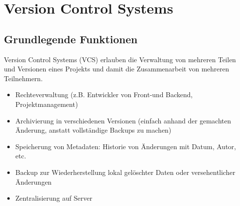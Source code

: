 \documentclass[12pt,a4]{article}
\begin{document}
	
	\section{Version Control Systems}

	\subsection{Grundlegende Funktionen}
		Version Control Systems (VCS) erlauben die Verwaltung von mehreren Teilen und Versionen eines Projekts und damit die Zusammenarbeit von mehreren Teilnehmern.
	\begin{itemize}
		\item Rechteverwaltung (z.B. Entwickler von Front-und Backend, Projektmanagement)
		\item Archivierung in verschiedenen Versionen (einfach anhand der gemachten Änderung, anstatt vollständige Backups zu machen)
		\item Speicherung von Metadaten: Historie von Änderungen mit Datum, Autor, etc.
		\item Backup zur Wiederherstellung lokal gelöschter Daten oder versehentlicher Änderungen
		\item Zentralisierung auf Server
		
	\end{itemize}
\end{document}
